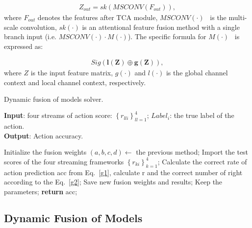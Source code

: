 \documentclass[letterpaper]{article} \usepackage[submission]{aaai23}  \usepackage{times}  \usepackage{helvet}  \usepackage{courier}  \usepackage[hyphens]{url}  \usepackage{graphicx} \urlstyle{rm} \def\UrlFont{\rm}  \usepackage{natbib}  \usepackage{caption} \frenchspacing  \setlength{\pdfpagewidth}{8.5in} \setlength{\pdfpageheight}{11in} \usepackage{algorithm}
\begin{document}
\begin{align}
Z_{out} =sk\left ( MSCONV\left ( F_{out}  \right )   \right ), 
\end{align}
where $F_{out}$ denotes the features after TCA module, $MS CONV(\cdot)$~\cite{2021Channel} is the multi-scale convolution, $sk(\cdot)$ is an attentional feature fusion method with a single branch input (i.e. $MSCONV\left (\cdot  \right )\cdot M\left ( \cdot \right )$). The specific formula for $M\left ( \cdot \right )$~\cite{2020Attentional} is expressed as:


\begin{align}
 Sig(\mathbf{l}(\mathbf{Z}) \oplus \mathbf{g}(\mathbf{Z})),
\end{align}
where $Z$ is the input feature matrix, $g(\cdot)$ and $l(\cdot)$ is the global channel context and local channel context, respectively.




\begin{algorithm}[tb]
\caption{Dynamic fusion of models solver.}
\label{tab:al}
\textbf{Input}: four streams of action score: $\left \{ r_{lli} \right \} _{ll=1}^{4}$; $Label_{i}$: the true label of the action.\\
\textbf{Output}: Action accuracy.
\begin{algorithmic}[1] \STATE Initialize the fusion weights $\left ( a,b,c,d \right ) \longleftarrow $ the previous method;
\STATE Import the test scores of the four streaming frameworks $\left \{ r_{ki} \right \} _{k=1}^{4}$;
\WHILE{b$>$a$>$c$>$d and $\left ( a,b,c,d \right ) \longleftarrow$ (0,1]}
\STATE Calculate the correct rate of action prediction acc from Eq.~\ref{g1}, calculate r and the correct number of right according to the Eq.~\ref{g2};
\STATE Save new fusion weights and results;
\ELSE
\STATE Keep the parameters;
\ENDIF
\ENDWHILE
\STATE \textbf{return} acc;
\end{algorithmic}
\end{algorithm}









\subsection{Dynamic Fusion of Models}
\label{sec:E}
\end{document}
